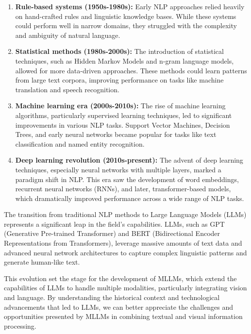 \begin{enumerate}
    \item \textbf{Rule-based systems (1950s-1980s):} Early NLP approaches relied heavily on hand-crafted rules and linguistic knowledge bases. While these systems could perform well in narrow domains, they struggled with the complexity and ambiguity of natural language.
    
    \item \textbf{Statistical methods (1980s-2000s):} The introduction of statistical techniques, such as Hidden Markov Models and n-gram language models, allowed for more data-driven approaches. These methods could learn patterns from large text corpora, improving performance on tasks like machine translation and speech recognition.
    
    \item \textbf{Machine learning era (2000s-2010s):} The rise of machine learning algorithms, particularly supervised learning techniques, led to significant improvements in various NLP tasks. Support Vector Machines, Decision Trees, and early neural networks became popular for tasks like text classification and named entity recognition.
    
    \item \textbf{Deep learning revolution (2010s-present):} The advent of deep learning techniques, especially neural networks with multiple layers, marked a paradigm shift in NLP. This era saw the development of word embeddings, recurrent neural networks (RNNs), and later, transformer-based models, which dramatically improved performance across a wide range of NLP tasks.
\end{enumerate}

The transition from traditional NLP methods to Large Language Models (LLMs) represents a significant leap in the field's capabilities. LLMs, such as GPT (Generative Pre-trained Transformer) and BERT (Bidirectional Encoder Representations from Transformers), leverage massive amounts of text data and advanced neural network architectures to capture complex linguistic patterns and generate human-like text.

This evolution set the stage for the development of MLLMs, which extend the capabilities of LLMs to handle multiple modalities, particularly integrating vision and language. By understanding the historical context and technological advancements that led to LLMs, we can better appreciate the challenges and opportunities presented by MLLMs in combining textual and visual information processing.

